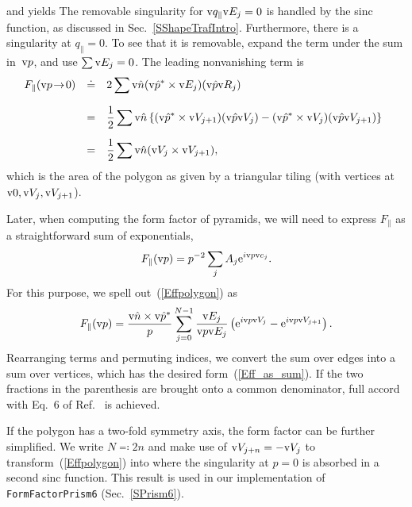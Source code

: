 and yields
The removable singularity for $\text{v}{q}_\parallel\text{v}{E}_j=0$
is handled by the sinc function, as discussed in Sec.~\ref{SShapeTrafIntro}.
Furthermore, there is a singularity at $q_\parallel=0$.
To see that it is removable,
expand the term under the sum in~$\text{v}{p}$,
and use $\sum\text{v}{E}_j=0$.
The leading nonvanishing term is
\begin{equation}
  \begin{array}{@{}lcl}
  F_\parallel(\qp\!\to\!0)
    &\doteq& \displaystyle 2\sum \n(\uqp^*\times\E_j) (\uqp\R_j)\\[3ex]
    &=&\displaystyle \frac{1}{2}\sum \n\left\{
        (\uqp^*\times\V_{j+1})(\uqp\V_j)
      - (\uqp^*\times\V_j)(\uqp\V_{j+1})
      \right\}\\[3ex]
    &=&\displaystyle \frac{1}{2}\sum \n(\V_j\times\V_{j+1}),
  \end{array}
\end{equation}
which is the area of the polygon
as given by a triangular tiling (with vertices at $\text{v}{0},\text{v}{V}_j,\text{v}{V}_{j+1}$).

Later, when computing the form factor of pyramids,
we will need to express $F_\parallel$ as a straightforward sum
of exponentials,
\begin{equation}\label{Eff_as_sum}
  F_\parallel(\text{v}{p})=p^{-2}\sum_j A_j \text{e}^{i\text{v}{p} \text{v}{c}_j}.
\end{equation}
For this purpose,
we spell out~(\ref{Effpolygon}) as
\begin{equation}
    F_\parallel(\text{v}{p})
    = \frac{\text{v}{\hat n}\times\text{v}{\hat p}^*}{p} \sum_{j=0}^{N-1} \frac{\text{v}{E}_j}{\text{v}{p}\text{v}{E}_j}
       \left(\text{e}^{i\text{v}{p}\text{v}{V}_j}-\text{e}^{i\text{v}{p}\text{v}{V}_{j+1}}\right).
\end{equation}
Rearranging terms and permuting indices,
we convert the sum over edges into a sum over vertices,
which has the desired form~(\ref{Eff_as_sum}).
If the two fractions in the parenthesis are brought onto a common denominator,
full accord with Eq.~6 of Ref.~\cite{LeMi83} is achieved.

If the polygon has a two-fold symmetry axis,
the form factor can be further simplified.
We write $N\eqqcolon2n$
and make use of $\text{v}{V}_{j+n}=-\text{v}{V}_j$ to transform~(\ref{Effpolygon}) into
where the singularity at $p=0$ is absorbed in a second sinc function.
This result is used in our implementation of \texttt{FormFactorPrism6}
(Sec.~\ref{SPrism6}).
%

